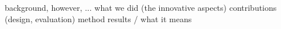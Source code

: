 


background, however, ...
what we	did (the innovative aspects)
contributions (design, evaluation) method
results / what it means